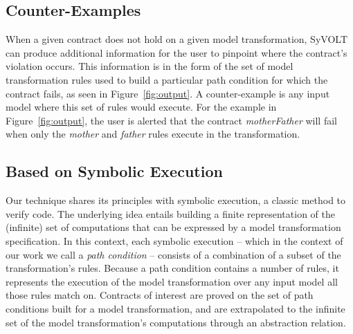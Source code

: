 \subsection{Counter-Examples}

When a given contract does not hold on a given model transformation,
SyVOLT can produce additional information for the user to pinpoint where
the contract's violation occurs. This information is in
the form of the set of model transformation rules used to build a particular
path condition for which the contract fails, as seen in Figure~\ref{fig:output}. A counter-example is any input model where this set of rules would execute. For the example in Figure~\ref{fig:output}, the user is alerted that the contract \textit{motherFather} will fail when only the \textit{mother} and \textit{father} rules execute in the transformation.



\subsection{Based on Symbolic Execution}

Our technique shares its principles with symbolic execution, a classic method to
verify code. The underlying idea entails building a finite representation of the
(infinite) set of computations that can be expressed by a model transformation
specification. In this context, each symbolic execution -- which in the context
of our work we call a \emph{path condition} -- consists of a combination
of a subset of the transformation's rules.
Because a path condition contains a number of rules, it represents the execution
of the model transformation over any input model all those rules match on.
Contracts of interest are proved on the set of path conditions built for a
model transformation, and are extrapolated to the infinite set of
the model transformation's computations through an abstraction relation.









